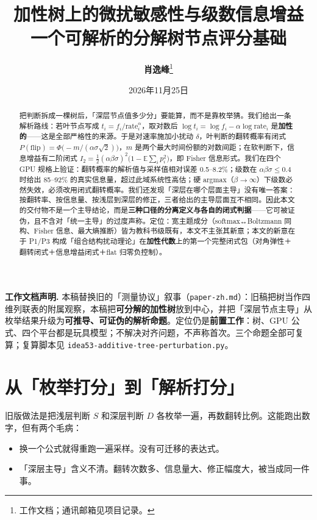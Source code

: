 \documentclass[12pt]{ctexart}
\title{\textbf{加性树上的微扰敏感性与级数信息增益}\\[4pt]\large 一个可解析的分解树节点评分基础}
\author{\textbf{肖逸峰}\thanks{工作文档；通讯邮箱见项目记录。}}
\date{2026年11月25日}
\newcommand{\E}{\mathbb{E}}
\newcommand{\rate}{\mathrm{rate}}
\newcommand{\flip}{\mathrm{flip}}
\begin{document}
\maketitle

\noindent\textbf{工作文档声明.} 本稿替换旧的「测量协议」叙事（\texttt{paper-zh.md}）：旧稿把树当作四维列联表的附属观察，本稿把\textbf{可分解的加性树}放到中心，并把「深层节点主导」从枚举结果升级为\textbf{可推导、可证伪的解析命题}。定位仍是\textbf{前置工作}：树、GPU 公式、四个平台都是玩具模型；不解决对齐问题，不声称首次。三个命题全部可复算；复算脚本见 \texttt{idea53-additive-tree-\allowbreak perturbation.py}。

\begin{abstract}
把判断拆成一棵树后，「深层节点值多少分」要能算，而不是靠枚举猜。我们给出一条解析路线：若叶节点写成 $t_i=f_i/\rate_i^{\alpha}$，取对数后 $\log t_i=\log f_i-\alpha\log\rate_i$ 是\textbf{加性的}——这是全部严格性的来源。于是对速率施加小扰动 $\delta$，叶判断的翻转概率有闭式 $P(\flip)=\Phi\!\big(-m/(\alpha\sigma\sqrt2)\big)$，$m$ 是两个最大时间份额的对数间距；在软判断下，信息增益有二阶闭式 $I_2=\tfrac12(\alpha\beta\sigma)^2\big(1-\E\sum_i p_i^2\big)$，即 Fisher 信息形式。我们在四个 GPU 规格上验证：翻转概率的解析值与采样值相对误差 0.5--8.2\%；级数在 $\alpha\beta\sigma\le0.4$ 时给出 85--92\% 的真实信息量，超过此域系统性高估；硬 argmax（$\beta\to\infty$）下级数必然失效，必须改用闭式翻转概率。我们还发现「深层在哪个层面主导」没有唯一答案：按翻转率、按信息量、按浅层到深层的修正，三者给出的主导层面互不相同。因此本文的交付物不是一个主导结论，而是\textbf{三种口径的分离定义与各自的闭式判据}——它可被证伪，且不含对「统一主导」的过度声称。定位：宽主题成分（softmax↔Boltzmann 同构、Fisher 信息、最大熵推断）皆为教科书级既有，本文不主张其新意；本文的新意在于 P1/P3 构成「组合结构扰动理论」在\textbf{加性代数}上的第一个完整闭式包（对角弹性＋翻转闭式＋信息增益闭式＋flat 归零负控制）。
\end{abstract}

\section{从「枚举打分」到「解析打分」}

旧版做法是把浅层判断 $S$ 和深层判断 $D$ 各枚举一遍，再数翻转比例。这能跑出数字，但有两个毛病：

\begin{itemize}
  \item 换一个公式就得重跑一遍采样。没有可迁移的表达式。
  \item 「深层主导」含义不清。翻转次数多、信息量大、修正幅度大，被当成同一件事。
\end{itemize}
\end{document}
